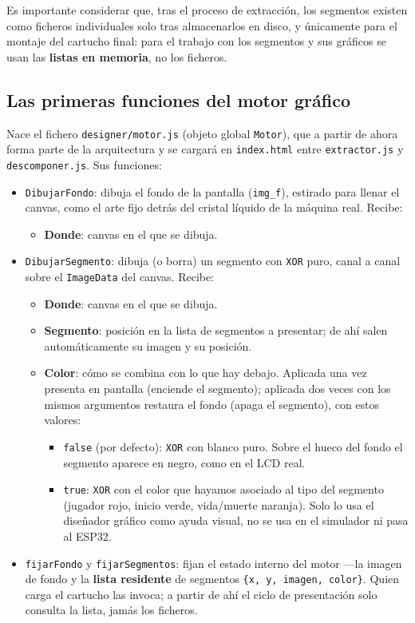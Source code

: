 Es importante considerar que, tras el proceso de extracción, los segmentos existen como ficheros individuales solo tras almacenarlos en disco, y únicamente para el montaje del cartucho final: para el trabajo con los segmentos y sus gráficos se usan las \textbf{listas en memoria}, no los ficheros.

\subsection{Las primeras funciones del motor gráfico}

Nace el fichero \texttt{designer/motor.js} (objeto global \texttt{Motor}), que a partir de ahora forma parte de la arquitectura y se cargará en \texttt{index.html} entre \texttt{extractor.js} y \texttt{descomponer.js}. Sus funciones:

\begin{itemize}
	\item \texttt{DibujarFondo}: dibuja el fondo de la pantalla (\texttt{img\_f}), estirado para llenar el canvas, como el arte fijo detrás del cristal líquido de la máquina real. Recibe:
	\begin{itemize}
		\item \textbf{Donde}: canvas en el que se dibuja.
	\end{itemize}
	\item \texttt{DibujarSegmento}: dibuja (o borra) un segmento con \texttt{XOR} puro, canal a canal sobre el \texttt{ImageData} del canvas. Recibe:
	\begin{itemize}
		\item \textbf{Donde}: canvas en el que se dibuja.
		\item \textbf{Segmento}: posición en la lista de segmentos a presentar; de ahí salen automáticamente su imagen y su posición.
		\item \textbf{Color}: cómo se combina con lo que hay debajo. Aplicada una vez presenta en pantalla (enciende el segmento); aplicada dos veces con los mismos argumentos restaura el fondo (apaga el segmento), con estos valores:
		\begin{itemize}
			\item \texttt{false} (por defecto): \texttt{XOR} con blanco puro. Sobre el hueco del fondo el segmento aparece en negro, como en el LCD real.
			\item \texttt{true}: \texttt{XOR} con el color que hayamos asociado al tipo del segmento (jugador rojo, inicio verde, vida/muerte naranja). Solo lo usa el diseñador gráfico como ayuda visual, no se usa en el simulador ni pasa al ESP32.
		\end{itemize}
	\end{itemize}
	\item \texttt{fijarFondo} y \texttt{fijarSegmentos}: fijan el estado interno del motor ---la imagen de fondo y la \textbf{lista residente} de segmentos \texttt{\{x, y, imagen, color\}}. Quien carga el cartucho las invoca; a partir de ahí el ciclo de presentación solo consulta la lista, jamás los ficheros.
\end{itemize}

